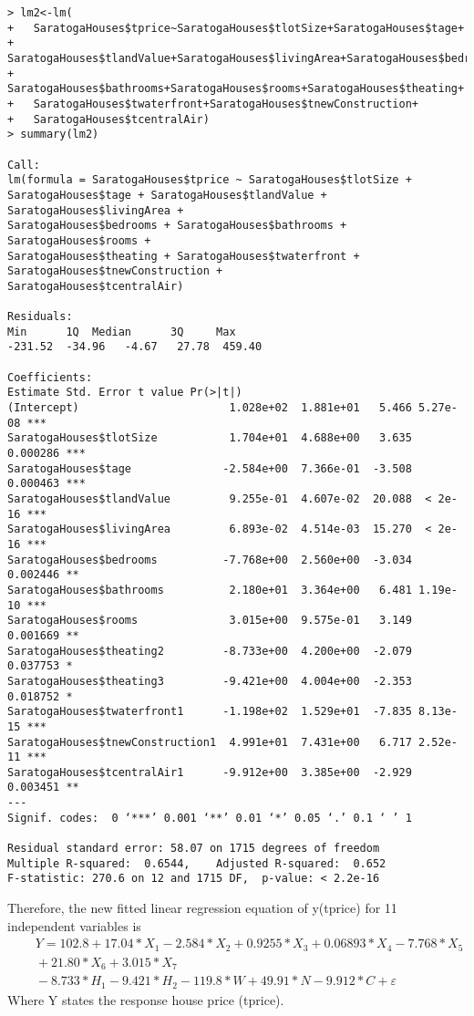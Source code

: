 \documentclass[12pt]{article}
\begin{document}
\begin{verbatim}
> lm2<-lm(
+   SaratogaHouses$tprice~SaratogaHouses$tlotSize+SaratogaHouses$tage+
+   SaratogaHouses$tlandValue+SaratogaHouses$livingArea+SaratogaHouses$bedrooms+
+   SaratogaHouses$bathrooms+SaratogaHouses$rooms+SaratogaHouses$theating+
+   SaratogaHouses$twaterfront+SaratogaHouses$tnewConstruction+
+   SaratogaHouses$tcentralAir)
> summary(lm2)

Call:
lm(formula = SaratogaHouses$tprice ~ SaratogaHouses$tlotSize + 
SaratogaHouses$tage + SaratogaHouses$tlandValue + SaratogaHouses$livingArea + 
SaratogaHouses$bedrooms + SaratogaHouses$bathrooms + SaratogaHouses$rooms + 
SaratogaHouses$theating + SaratogaHouses$twaterfront + 
SaratogaHouses$tnewConstruction + 
SaratogaHouses$tcentralAir)

Residuals:
Min      1Q  Median      3Q     Max 
-231.52  -34.96   -4.67   27.78  459.40 

Coefficients:
Estimate Std. Error t value Pr(>|t|)    
(Intercept)                       1.028e+02  1.881e+01   5.466 5.27e-08 ***
SaratogaHouses$tlotSize           1.704e+01  4.688e+00   3.635 0.000286 ***
SaratogaHouses$tage              -2.584e+00  7.366e-01  -3.508 0.000463 ***
SaratogaHouses$tlandValue         9.255e-01  4.607e-02  20.088  < 2e-16 ***
SaratogaHouses$livingArea         6.893e-02  4.514e-03  15.270  < 2e-16 ***
SaratogaHouses$bedrooms          -7.768e+00  2.560e+00  -3.034 0.002446 ** 
SaratogaHouses$bathrooms          2.180e+01  3.364e+00   6.481 1.19e-10 ***
SaratogaHouses$rooms              3.015e+00  9.575e-01   3.149 0.001669 ** 
SaratogaHouses$theating2         -8.733e+00  4.200e+00  -2.079 0.037753 *  
SaratogaHouses$theating3         -9.421e+00  4.004e+00  -2.353 0.018752 *  
SaratogaHouses$twaterfront1      -1.198e+02  1.529e+01  -7.835 8.13e-15 ***
SaratogaHouses$tnewConstruction1  4.991e+01  7.431e+00   6.717 2.52e-11 ***
SaratogaHouses$tcentralAir1      -9.912e+00  3.385e+00  -2.929 0.003451 ** 
---
Signif. codes:  0 ‘***’ 0.001 ‘**’ 0.01 ‘*’ 0.05 ‘.’ 0.1 ‘ ’ 1

Residual standard error: 58.07 on 1715 degrees of freedom
Multiple R-squared:  0.6544,	Adjusted R-squared:  0.652 
F-statistic: 270.6 on 12 and 1715 DF,  p-value: < 2.2e-16
\end{verbatim}
Therefore, the new fitted linear regression equation of y(tprice) for 11 independent variables is 
\begin{equation}
\begin{split} 
&\quad Y = 102.8 + 17.04*X_1 - 2.584*X_2 + 0.9255*X_3 + 0.06893*X_4 - 7.768*X_5\\
&\quad + 21.80*X_6 + 3.015*X_7\\
&\quad - 8.733*H_1 - 9.421*H_2 - 119.8*W + 49.91*N - 9.912*C + \varepsilon
\end{split}
\end{equation}
Where Y states the response house price (tprice).
\end{document}
